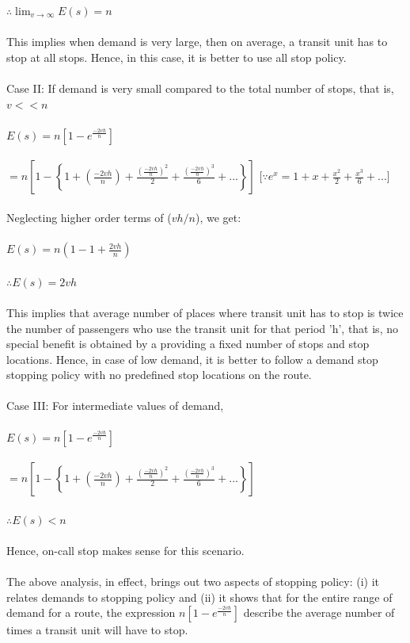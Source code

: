$ \therefore \lim_{v \to \infty} E(s) = n $\\\\
This implies when demand is very large, then on average, a transit unit has to stop at all stops. Hence, in this case, it is better to use all stop policy.\\\\
Case II: If demand is very small compared to the total number of stops, that is, $ v << n $\\\\
$ E(s) = n \left[1 - e^\frac{-2vh}{n}\right] $\\\\
$ = n \left[ 1 -\left\{ 1 + \left( \frac{-2vh}{n} \right) + \frac{(\frac{-2vh}{n})^2}{2} + \frac{(\frac{-2vh}{n})^3}{6} + ... \right\} \right] $ [$ \because e^x = 1 + x + \frac{x^2}{2} + \frac{x^3}{6} + ... $]\\\\
Neglecting higher order terms of ($ vh/n $), we get:\\\\
$ E(s) = n \left( 1 - 1 + \frac{2vh}{n} \right) $\\\\
$ \therefore E(s) = 2vh $\\\\
This implies that average number of places where transit unit has to stop is twice the number of passengers who use the transit unit for that period 'h', that is, no special benefit is obtained by a providing a fixed number of stops and stop locations. Hence, in case of low demand, it is better to follow a demand stop stopping policy with no predefined stop locations on the route.\\\\
Case III: For intermediate values of demand,\\\\
$ E(s) = n \left[1 - e^\frac{-2vh}{n}\right] $\\\\
$ = n \left[ 1 -\left\{ 1 + \left( \frac{-2vh}{n} \right) + \frac{(\frac{-2vh}{n})^2}{2} + \frac{(\frac{-2vh}{n})^3}{6} + ... \right\} \right] $\\\\
$ \therefore E(s) < n $\\\\
Hence, on-call stop makes sense for this scenario.\\\\
The above analysis, in effect, brings out two aspects of stopping policy: (i) it relates demands to stopping policy and (ii) it shows that for the entire range of demand for a route, the expression $n\left[1 - e^\frac{-2vh}{n}\right]$ describe the average number of times a transit unit will have to stop.
\begin{center}
\end{center}
